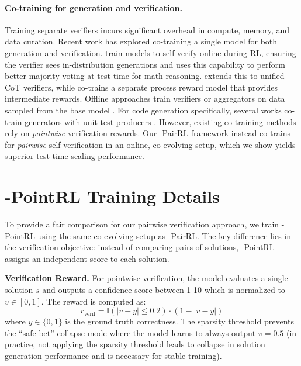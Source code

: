 \paragraph{Co-training for generation and verification.}
Training separate verifiers incurs significant overhead in compute, memory, and data curation. Recent work has explored co-training a single model for both generation and verification. \citet{sareen2025puttingvaluerlbetter} train models to self-verify online during RL, ensuring the verifier sees in-distribution generations and uses this capability to perform better majority voting at test-time for math reasoning. \citet{liu2025trustverifyselfverificationapproach} extends this to unified CoT verifiers, while \citet{zha2025rltangoreinforcinggenerator} co-trains a separate process reward model that provides intermediate rewards. Offline approaches train verifiers or aggregators on data sampled from the base model \citep{venkatraman2025recursiveselfaggregationunlocksdeep, ruan2025critiquecoderenhancingcodermodels}. For code generation specifically, several works co-train generators with unit-test producers \citep{wang2025coevolvingllmcoderunit, lee2025learninggenerateunittest}. However, existing co-training methods rely on \textit{pointwise} verification rewards. Our \method{}-PairRL framework instead co-trains for \textit{pairwise} self-verification in an online, co-evolving setup, which we show yields superior test-time scaling performance.

\section{\method{}-PointRL Training Details}
\label{sec:appendix-pointwise-training}

To provide a fair comparison for our pairwise verification approach, we train \method{}-PointRL using the same co-evolving setup as \method{}-PairRL. The key difference lies in the verification objective: instead of comparing pairs of solutions, \method{}-PointRL assigns an independent score to each solution.

\textbf{Verification Reward.} For pointwise verification, the model evaluates a single solution $s$ and outputs a confidence score between 1-10 which is normalized to $v \in [0, 1]$. The reward is computed as:
\begin{equation}
    r_{\text{verif}} = \mathbb{I}(|v - y| \leq 0.2) \cdot (1 - |v - y|)
\end{equation}
where $y \in \{0, 1\}$ is the ground truth correctness. The sparsity threshold prevents the ``safe bet'' collapse mode where the model learns to always output $v = 0.5$ (in practice, not applying the sparsity threshold leads to collapse in solution generation performance and is necessary for stable training).

